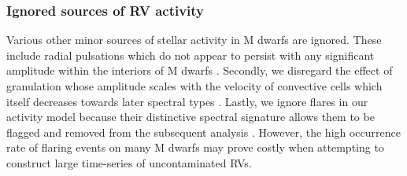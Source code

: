 \subsubsection{Ignored sources of RV activity}
Various other minor sources of stellar activity in M dwarfs are ignored. These include radial pulsations which 
do not appear to persist with any significant amplitude within the interiors of M dwarfs
\citep{rodriguezlopez15}. Secondly, we disregard the effect of granulation whose amplitude scales
with the velocity of convective cells which itself decreases towards later spectral types
\citep{dumusque11, meunier17}.
Lastly, we ignore flares in our activity model because their distinctive
spectral signature allows them to be flagged and removed from the subsequent analysis
\citep{schmidt12, angladaescude16}.
However, the high occurrence rate of flaring events on many M dwarfs may prove costly when attempting to
construct large time-series of uncontaminated RVs.


